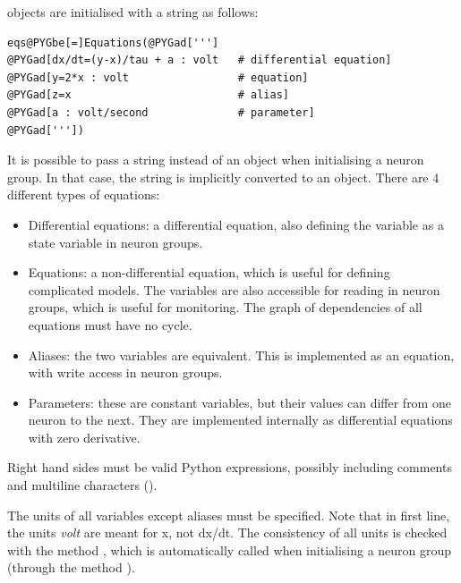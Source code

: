 \documentclass[letterpaper,10pt]{manual}
\begin{document}
\hyperlink{brian.Equations}{} objects are initialised with a string as follows:

\begin{Verbatim}[commandchars=@\[\]]
eqs@PYGbe[=]Equations(@PYGad[''']
@PYGad[dx/dt=(y-x)/tau + a : volt   # differential equation]
@PYGad[y=2*x : volt                 # equation]
@PYGad[z=x                          # alias]
@PYGad[a : volt/second              # parameter]
@PYGad['''])
\end{Verbatim}
It is possible to pass a string instead of an \hyperlink{brian.Equations}{} object when initialising
a neuron group. In that case, the string is implicitly converted to an \hyperlink{brian.Equations}{} object.
There are 4 different types of equations:
\begin{itemize}
\item {} 
Differential equations: a differential equation, also defining the variable as a state
variable in neuron groups.

\item {} 
Equations: a non-differential equation, which is useful for defining complicated models.
The variables are also accessible for reading in neuron groups, which is useful for
monitoring. The graph of dependencies of all equations must have no cycle.

\item {} 
Aliases: the two variables are equivalent. This is implemented as an equation,
with write access in neuron groups.

\item {} 
Parameters: these are constant variables, but their values can differ from one neuron
to the next. They are implemented internally as differential equations with zero
derivative.

\end{itemize}

Right hand sides must be valid Python expressions, possibly including comments and
multiline characters (\code{\textbackslash{}}).

The units of all variables except aliases must be specified. Note that in first line,
the units \emph{volt} are meant for x, not dx/dt. The consistency of all units is checked
with the method , which is automatically called
when initialising a neuron group (through the method ).
\end{document}
